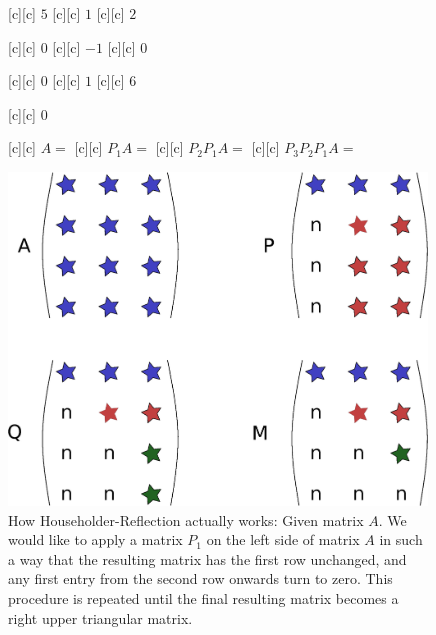 \begin{figure}[htb!]
	\centering
	\footnotesize

	[c] {$5$}
	[c] {$1$}
	[c] {$2$}

	[c] {$0$}
	[c] {$-1$}
	[c] {$0$}

	[c] {$0$}
	[c] {$1$}
	[c] {$6$}

	[c] {$0$}

	[c] {$A=$}
	[c] {$P_{1}A=$}
	[c] {$P_{2}P_{1}A=$}
	[c] {$P_{3}P_{2}P_{1}A=$}


	\includegraphics[width=0.99\textwidth]{householder.eps}
	\caption{How Householder-Reflection actually works: Given matrix $A$.
	We would like to apply a matrix $P_1$ on the left side of matrix $A$ 
	in such a way that the resulting matrix has the first row unchanged, 
	and any first entry from the second row onwards turn to zero. 
	This procedure is repeated until the final resulting matrix becomes
	a right upper triangular matrix.}
	\label{\LABEL}
\end{figure}
